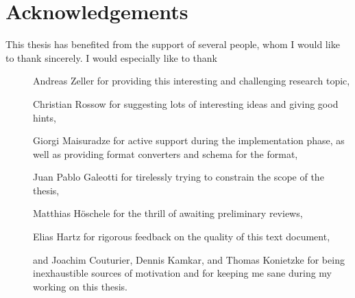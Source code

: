\section*{Acknowledgements}
This thesis has benefited from the support of several people, whom I would like to thank sincerely.
I would especially like to thank
\begin{description}
	\item[] Andreas Zeller for providing this interesting and challenging research topic,
	\item[] Christian Rossow for suggesting lots of interesting ideas and giving good hints,
	\item[] Giorgi Maisuradze for active support during the implementation phase, as well as providing format
	converters and schema for the \png format,
	\item[] Juan Pablo Galeotti for tirelessly trying to constrain the scope of the thesis,
 	\item[] Matthias Höschele for the thrill of awaiting preliminary reviews,
 	\item[] Elias Hartz for rigorous feedback on the quality of this text document,
	\item[] and Joachim Couturier, Dennis Kamkar, and Thomas Konietzke for being inexhaustible sources
	of motivation and for keeping me sane during my working on this thesis.
\end{description}